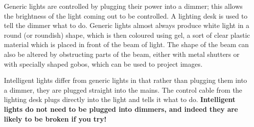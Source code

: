 \documentclass[14pt]{article} %
\begin{document}
Generic lights are controlled by plugging their power into a dimmer; this allows the brightness of the light coming out to be controlled. A lighting desk is used to tell the dimmer what to do. Generic lights almost always produce white light in a round (or roundish) shape, which is then coloured using gel, a sort of clear plastic material which is placed in front of the beam of light. The shape of the beam can also be altered by obstructing parts of the beam, either with metal shutters or with specially shaped gobos, which can be used to project images.

Intelligent lights differ from generic lights in that rather than plugging them into a dimmer, they are plugged straight into the mains. The control cable from the lighting desk plugs directly into the light and tells it what to do. 
\textbf{Intelligent lights do not need to be plugged into dimmers, and indeed they are likely to be broken if you try!}
\end{document}
